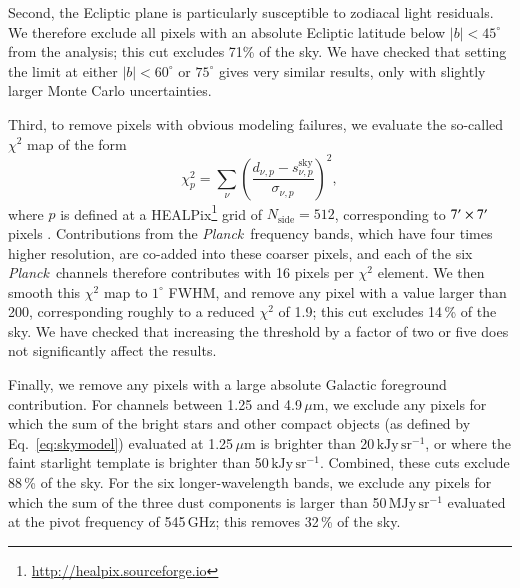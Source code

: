 \documentclass{aa}
\def\Planck{\textit{Planck}}
\def\Planck{\textit{Planck}}
\begin{document}
Second, the Ecliptic
plane is particularly susceptible to zodiacal light residuals. We
therefore exclude all pixels with an absolute Ecliptic latitude below
$|b|<45^{\circ}$ from the analysis; this cut excludes 71\% of the
sky. We have checked that setting the limit at either $|b|<60^{\circ}$
or $75^{\circ}$ gives very similar results, only with slightly larger
Monte Carlo uncertainties.

Third, to remove pixels with obvious modeling failures, we
evaluate the so-called $\chi^2$ map of the form
\begin{equation}
\chi_p^2 = \sum_{\nu} \left(\frac{d_{\nu,p}-s_{\nu,p}^{\mathrm{sky}}}{\sigma_{\nu,p}}\right)^2,
\end{equation}
where $p$ is defined at a HEALPix\footnote{\url{http://healpix.sourceforge.io}} grid of $N_{\mathrm{side}}=512$,
corresponding to $7\arcmin\times 7\arcm$ pixels
\citep{healpix}. Contributions from the \Planck\ frequency bands,
which have four times higher resolution, are co-added into these
coarser pixels, and each of the six \Planck\ channels therefore
contributes with 16 pixels per $\chi^2$ element. We then smooth this
$\chi^2$ map to $1^{\circ}$ FWHM, and remove any pixel with a value
larger than 200, corresponding roughly to a reduced $\chi^2$ of 1.9;
this cut excludes 14\,\% of the sky. We have checked that increasing the
threshold by a factor of two or five does not significantly affect the
results.

Finally, we remove any pixels with a large absolute Galactic
foreground contribution. For channels between 1.25 and
4.9\,$\mu\mathrm{m}$, we exclude any pixels for which the sum of the
bright stars and other compact objects (as defined by
Eq.~\ref{eq:skymodel}) evaluated at 1.25\,$\mu\mathrm{m}$ is brighter
than 20\,$\mathrm{kJy\,sr^{-1}}$, or where the faint starlight template is brighter
than 50\,$\mathrm{kJy\,sr^{-1}}$. Combined, these cuts exclude 88\,\% of the sky. For
the six longer-wavelength bands, we exclude any pixels for which the
sum of the three dust components is larger than 50\,$\mathrm{MJy\,sr^{-1}}$ evaluated
at the pivot frequency of 545\,GHz; this removes 32\,\% of the sky.
\end{document}

